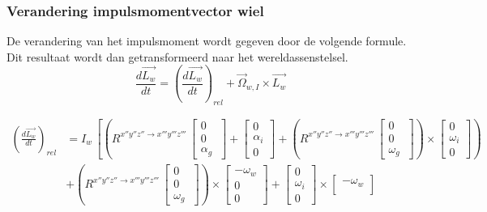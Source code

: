 \subsubsection{Verandering impulsmomentvector wiel}
De verandering van het impulsmoment wordt gegeven door de volgende formule. Dit resultaat wordt dan getransformeerd naar het wereldassenstelsel.
\begin{equation*}
\frac{d\overrightarrow{L_{w}}}{dt} = \left(\frac{d\overrightarrow{L_{w}}}{dt}\right)_{rel}+\overrightarrow{\Omega}_{w,I}\times\overrightarrow{L_{w}}
\end{equation*}

\begin{align*}
\left(\frac{d\overrightarrow{L_{w}}}{dt}\right)_{rel}&=I_{w}\,\left[\left(R^{x''y''z'' \rightarrow x'''y'''z'''}\,\begin{bmatrix}
0\\
0\\
\alpha_{g}\
\end{bmatrix}
+\begin{bmatrix}
0\\
\alpha_{i}\\
0\
\end{bmatrix}
+\left(R^{x''y''z'' \rightarrow x'''y'''z'''}\,\begin{bmatrix}
0\\
0\\
\omega_{g}\
\end{bmatrix}
\right)\times\begin{bmatrix}
0\\
\omega_{i}\\
0\
\end{bmatrix}
\right)\right.\\
&\left.+\left(R^{x''y''z'' \rightarrow x'''y'''z'''}\,\begin{bmatrix}
0\\
0\\
\omega_{g}\
\end{bmatrix}\right)\times\begin{bmatrix}
-\omega_{w}\\
0\\
0\
\end{bmatrix}+\begin{bmatrix}
0\\
\omega_{i}\\
0\
\end{bmatrix}\times\begin{bmatrix}
-\omega_{w}\\

\end{bmatrix}
\end{align*}
